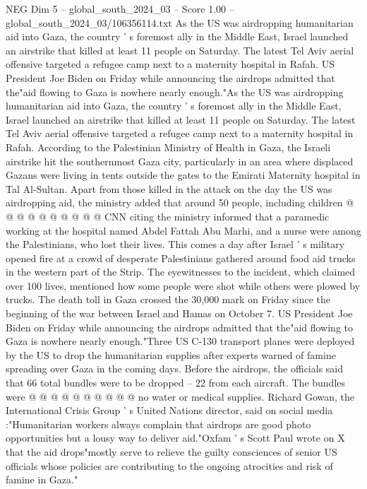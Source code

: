 \begin{textsample}{NEG Dim 5 – global\_south\_2024\_03 – Score 1.00 – global\_south\_2024\_03/106356114.txt}  \label{ex:f5_neg_205}
As the US was airdropping humanitarian aid into Gaza, the country ' s foremost ally in the Middle East, Israel launched an airstrike that killed at least 11 people on Saturday.
The latest Tel Aviv aerial offensive targeted a refugee camp next to a maternity hospital in Rafah.
US President Joe Biden on Friday while announcing the airdrops admitted that the"aid flowing to Gaza is nowhere nearly enough."As the US was airdropping humanitarian aid into Gaza, the country ' s foremost ally in the Middle East, Israel launched an airstrike that killed at least 11 people on Saturday.
The latest Tel Aviv aerial offensive targeted a refugee camp next to a maternity hospital in Rafah.
According to the Palestinian Ministry of Health in Gaza, the Israeli airstrike hit the southernmost Gaza city, particularly in an area where displaced Gazans were living in tents outside the gates to the Emirati Maternity hospital in Tal Al-Sultan.
Apart from those killed in the attack on the day the US was airdropping aid, the ministry added that around 50 people, including children @ @ @ @ @ @ @ @ @ @ CNN citing the ministry informed that a paramedic working at the hospital named Abdel Fattah Abu Marhi, and a nurse were among the Palestinians, who lost their lives.
This comes a day after Israel ' s military opened fire at a crowd of desperate Palestinians gathered around food aid trucks in the western part of the Strip.
The eyewitnesses to the incident, which claimed over 100 lives, mentioned how some people were shot while others were plowed by trucks.
The death toll in Gaza crossed the 30,000 mark on Friday since the beginning of the war between Israel and Hamas on October 7.
US President Joe Biden on Friday while announcing the airdrops admitted that the"aid flowing to Gaza is nowhere nearly enough."Three US C-130 transport planes were deployed by the US to drop the humanitarian supplies after experts warned of famine spreading over Gaza in the coming days.
Before the airdrops, the officials said that 66 total bundles were to be dropped -- 22 from each aircraft.
The bundles were @ @ @ @ @ @ @ @ @ @ no water or medical supplies.
Richard Gowan, the International Crisis Group ' s United Nations director, said on social media :"Humanitarian workers always complain that airdrops are good photo opportunities but a lousy way to deliver aid."Oxfam ' s Scott Paul wrote on X that the aid drops"mostly serve to relieve the guilty consciences of senior US officials whose policies are contributing to the ongoing atrocities and risk of famine in Gaza."

\end{textsample}
